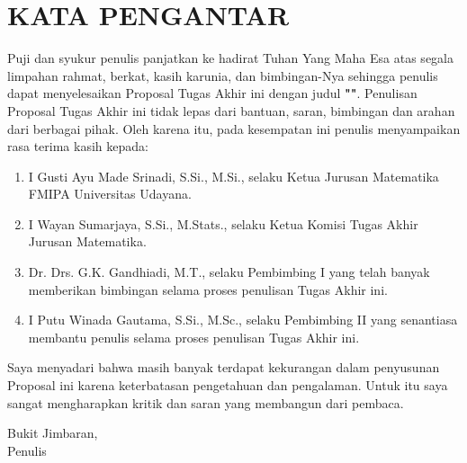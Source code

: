 \chapter*{\centering\small KATA PENGANTAR}

Puji dan syukur penulis panjatkan ke hadirat Tuhan Yang Maha Esa atas segala limpahan rahmat, berkat, kasih karunia, dan bimbingan-Nya sehingga penulis dapat menyelesaikan Proposal Tugas Akhir ini dengan judul \textbf{"\Judul"}. Penulisan Proposal Tugas Akhir ini tidak lepas dari bantuan, saran, bimbingan dan arahan dari berbagai pihak. Oleh karena itu, pada kesempatan ini penulis menyampaikan rasa terima kasih kepada:

\begin{enumerate}
  \item I Gusti Ayu Made Srinadi, S.Si., M.Si., selaku Ketua Jurusan Matematika FMIPA Universitas Udayana.
  \item I Wayan Sumarjaya, S.Si., M.Stats., selaku Ketua Komisi Tugas Akhir Jurusan Matematika.
  \item Dr. Drs. G.K. Gandhiadi, M.T., selaku Pembimbing I yang telah banyak memberikan bimbingan selama proses penulisan Tugas Akhir ini.
  \item I Putu Winada Gautama, S.Si., M.Sc., selaku Pembimbing II yang senantiasa membantu penulis selama proses penulisan Tugas Akhir ini.
\end{enumerate}

Saya menyadari bahwa masih banyak terdapat kekurangan dalam penyusunan Proposal ini karena keterbatasan pengetahuan dan pengalaman. Untuk itu saya sangat mengharapkan kritik dan saran yang membangun dari pembaca.

\begin{flushright}
  Bukit Jimbaran, \Tanggal\\
  \vspace{2cm}
  Penulis
\end{flushright}